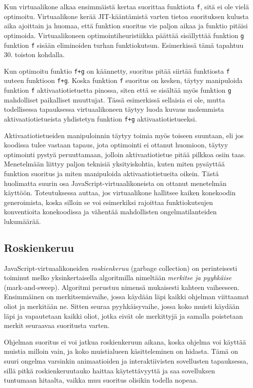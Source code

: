 Kun virtuaalikone alkaa ensimmäistä kertaa suorittaa funktiota \texttt{f}, sitä ei ole vielä optimoitu. Virtuaalikone kerää JIT-kääntämistä varten tietoa suorituksen kulusta aika ajoittain ja huomaa, että funktion suoritus vie paljon aikaa ja funktio pitäisi optimoida. Virtuaalikoneen optimointiheuristiikka päättää sisällyttää funktion \texttt{g} funktion \texttt{f} sisään eliminoiden turhan funktiokutsun. Esimerkissä tämä tapahtuu 30. toiston kohdalla.

Kun optimoitu funktio \texttt{f+g} on käännetty, suoritus pitää siirtää funktiosta \texttt{f} uuteen funktioon \texttt{f+g}. Koska funktion \texttt{f} suoritus on kesken, täytyy manipuloida funktion \texttt{f} aktivaatiotietuetta pinossa, siten että se sisältää myös funktion \texttt{g} mahdolliset paikalliset muuttujat. Tässä esimerkissä sellaisia ei ole, mutta todellisessa tapauksessa virtuaalikoneen täytyy luoda kuvaus molemmista aktivaatiotietueista yhdistetyn funktion \texttt{f+g} aktivaatiotietueeksi.

Aktivaatiotietueiden manipuloinnin täytyy toimia myös toiseen suuntaan, eli jos koodissa tulee vastaan tapaus, jota optimointi ei ottanut huomioon, täytyy optimointi pystyä peruuttamaan, jolloin aktivaatiotietue pitää pilkkoa osiin taas. Menetelmään liittyy paljon teknisiä yksityiskohtia, kuten miten pysäyttää funktion suoritus ja miten manipuloida aktivaatiotietueita oikein. Tästä huolimatta suurin osa JavaScript-virtuaalikoneista on ottanut menetelmän käyttöön. Toteutuksessa auttaa, jos virtuaalikone hallitsee kaiken konekoodin generoimista, koska silloin se voi esimerkiksi rajoittaa funktiokutsujen konventioita konekoodissa ja vähentää mahdollisten ongelmatilanteiden lukumäärää.

\subsection{Roskienkeruu}

JavaScript-virtuaalikoneiden \textit{roskienkeruu} (garbage collection) on perinteisesti toiminut melko yksinkertaisella algoritmilla nimeltään \textit{merkitse ja pyyhkäise} (mark-and-sweep). Algoritmi perustuu nimensä mukaisesti kahteen vaiheeseen. Ensimmäinen on merkitsemisvaihe, jossa käydään läpi kaikki ohjelman viittaamat oliot ja merkitään ne. Sitten seuraa pyyhkäisyvaihe, jossa koko muisti käydään läpi ja vapautetaan kaikki oliot, jotka eivät ole merkittyjä ja samalla poistetaan merkit seuraavaa suoritusta varten.

Ohjelman suoritus ei voi jatkua roskienkeruun aikana, koska ohjelma voi käyttää muistia milloin vain, ja koko muistialueen käsitteleminen on hidasta. Tämä on suuri ongelma varsinkin animaatioiden ja interaktiivisten sovellusten tapauksessa, sillä pitkä roskienkeruutauko haittaa käytettävyyttä ja saa sovelluksen tuntumaan hitaalta, vaikka muu suoritus olisikin todella nopeaa.

